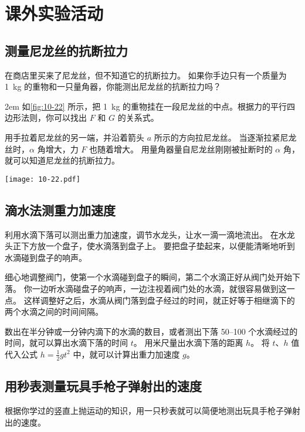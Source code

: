 \chapter*{课外实验活动}
\setcounter{section}{0}
\section{测量尼龙丝的抗断拉力}
在商店里买来了尼龙丝，但不知道它的抗断拉力。
如果你手边只有一个质量为 \qty{1}{kg} 的重物和一只量角器，你能测出尼龙丝的抗断拉力吗？

\medskip\noindent
\begin{minipage}{0.5\linewidth}\parindent2em
如\cref{fig:10-22} 所示，把 \qty{1}{kg} 的重物挂在一段尼龙丝的中点。根据力的平行四边形法则，你可以找出 $F$ 和 $G$ 的关系式。

用手拉着尼龙丝的另一端，并沿着箭头 $a$ 所示的方向拉尼龙丝。
当逐渐拉紧尼龙丝时，$\alpha$ 角增大，力 $F$ 也随着增大。
用量角器量自尼龙丝刚刚被扯断时的 $\alpha$ 角，就可以知道尼龙丝的抗断拉力。
\end{minipage}\hfill
\begin{minipage}{0.45\linewidth}\centering
  \begin{figurehere}
    \texttt{[image: 10-22.pdf]}
    \caption{}\label{fig:10-22}
  \end{figurehere}
\end{minipage}


\section{滴水法测重力加速度}
利用水滴下落可以测出重力加速度，调节水龙头，让水一滴一滴地流出。
在水龙头正下方放一个盘子，使水滴落到盘子上。
要把盘子垫起来，以便能清晰地听到水滴碰到盘子的响声。

细心地调整阀门，使第一个水滴碰到盘子的瞬间，第二个水滴正好从阀门处开始下落。
你一边听水滴碰盘子的响声，一边注视着阀门处的水滴，就很容易做到这一点。
这样调整好之后，水滴从阀门落到盘子经过的时间，就正好等于相继滴下的两个水滴之间的时间间隔。

数出在半分钟或一分钟内滴下的水滴的数目，或者测出下落 \numrange{50}{100} 个水滴经过的时间，就可以算出水滴下落的时间 $t$。
用米尺量出水滴下落的距离 $h$。
将 $t$、$h$ 值代入公式 $h=\frac{1}{2}gt^2$ 中，就可以计算出重力加速度 $g$。

\section{用秒表测量玩具手枪子弹射出的速度}
根据你学过的竖直上抛运动的知识，用一只秒表就可以简便地测出玩具手枪子弹射出的速度。

